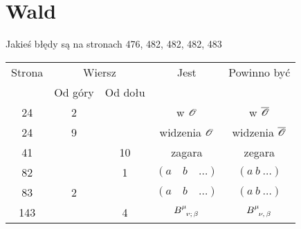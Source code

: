 \documentclass[a4paper,11pt]{article}
\numberwithin{equation}{section}
\begin{document}
\VerSpaceSix









\section{Wald}

\label{sec:Uwagi-ogolne}



Jakieś błędy są na stronach 476, 482, 482, 482, 483



\newpage



\begin{center}

  \begin{tabular}{|c|c|c|c|c|}
    \hline
    Strona & \multicolumn{2}{c|}{Wiersz} & Jest
                              & Powinno być \\ \cline{2-3}
    & Od góry & Od dołu & & \\
    \hline
    \hphantom{0}24 & \hphantom{0}2 & & w $\mathcal{O}$ & w $\overline{ \mathcal{O} }$ \\
    \hphantom{0}24 & \hphantom{0}9 & & widzenia $\mathcal{O}$
    & widzenia $\overline{ \mathcal{O} }$ \\
    \hphantom{0}41 & & 10 & zagara & zegara \\
    \hphantom{0}82 & & \hphantom{0}1 & $( a \quad b \quad \ldots )$ & $( a \: b \: \ldots )$ \\
    \hphantom{0}83 & \hphantom{0}2 & & $( a \quad b \quad \ldots )$ & $( a \: b \: \ldots )$ \\
    143 & & \hphantom{0}4 & $B\indices{^\mu_{ v ; \, \beta }}$
    & $B\indices{ ^\mu_{ \nu, \, \beta } }$ \\
    \hline
  \end{tabular}

\end{center}

\VerSpaceSix


\end{document}
